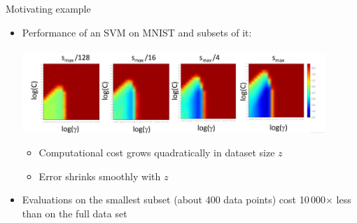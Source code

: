 
\begin{frame}[c]{Motivating example}

\begin{itemize}
    \item Performance of an SVM on MNIST and subsets of it:\\~\\
	    \includegraphics[width=0.9\textwidth]{../w07_hpo_speedup/images/fabolas/example_mnist.jpg}
	    \begin{itemize}
            \item Computational cost grows quadratically in dataset size $z$
            \item Error shrinks smoothly with $z$
        \end{itemize}
	\item Evaluations on the smallest subset (about 400 data points) cost 10\,000$\times$ less than on the full data set
    
\end{itemize}
\end{frame}

